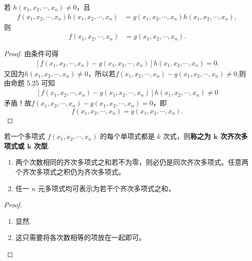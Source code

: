 \documentclass[../../main.tex]{subfiles}%
\begin{document}
\begin{corollary}
若 $h(x_1, x_2, \cdots, x_n) \neq 0$，且
\begin{align*}
f(x_1, x_2, \cdots, x_n)h(x_1, x_2, \cdots, x_n) &= g(x_1, x_2, \cdots, x_n)h(x_1, x_2, \cdots, x_n),
\end{align*}
则
\begin{align*}
f(x_1, x_2, \cdots, x_n) &= g(x_1, x_2, \cdots, x_n).
\end{align*}
\end{corollary}
\begin{proof}

由条件可得
\begin{align*}
\left[ f(x_1,x_2,\cdots ,x_n)-g(x_1,x_2,\cdots ,x_n) \right] h(x_1,x_2,\cdots ,x_n)=0.
\end{align*}
又因为$h(x_1,x_2,\cdots ,x_n)\ne 0，所以若 f(x_1,x_2,\cdots ,x_n)-g(x_1,x_2,\cdots ,x_n)\ne 0$,则由命题 5.25 可知
\begin{align*}
\left[ f(x_1,x_2,\cdots ,x_n)-g(x_1,x_2,\cdots ,x_n) \right] h(x_1,x_2,\cdots ,x_n)\ne 0
\end{align*}
矛盾！故$f(x_1,x_2,\cdots ,x_n)-g(x_1,x_2,\cdots ,x_n)=0$，即\[f(x_1,x_2,\cdots ,x_n)=g(x_1,x_2,\cdots ,x_n).\]

\end{proof}



\begin{definition}[齐次多项式]
若一个多项式 \(f(x_1,x_2,\cdots ,x_n)\) 的每个单项式都是 \(k\) 次式，则\textbf{称之为 \(\boldsymbol{k}\) 次齐次多项式或 \(\boldsymbol{k}\) 次型}.
\end{definition}

\begin{proposition}[齐次多项式的基本性质]
\begin{enumerate}[(1)]
\item 两个次数相同的齐次多项式之和若不为零，则必仍是同次齐次多项式。任意两个齐次多项式之积仍为齐次多项式。

\item 任一 \(n\) 元多项式均可表示为若干个齐次多项式之和，
\end{enumerate}
\end{proposition}
\begin{proof}
\begin{enumerate}[(1)]
\item 显然.

\item 这只需要将各次数相等的项放在一起即可。
\end{enumerate}

\end{proof}
\end{document}
